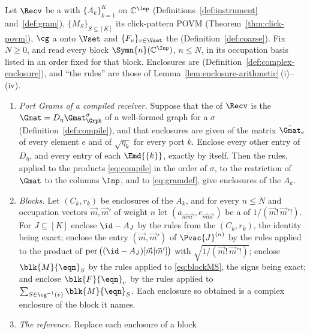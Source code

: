 \begin{theorem}\label{thm:enclosed-blocks}
Let $\Recv$ be a  with
 $\{A_k\}_{k=1}^{K}$ on
$\mathbb{C}^{\Inp}$ (Definitions~\ref{def:instrument} and~\ref{def:gram}),
$\{M_S\}_{S\subseteq[K]}$ its click-pattern POVM
(Theorem~\ref{thm:click-povm}), $\cg$ a  onto
$\Vset$ and $\{F_v\}_{v\in\Vset}$ the 
(Definition~\ref{def:coarse}). Fix $N\ge0$, and read every block
$\Symn{n}(\mathbb{C}^{\Inp})$, $n\le N$, in its occupation basis listed in an
order fixed for that block. Enclosures are
(Definition~\ref{def:complex-enclosure}), and ``the rules'' are those of
Lemma~\ref{lem:enclosure-arithmetic}\,(i)--(iv).
\begin{enumerate}[label=(\roman*),leftmargin=3.0em]
\item \emph{Port Grams of a compiled receiver.} Suppose that the
   of $\Recv$ is the
   $\Gmat=D_\eta\Gmat^{\sigma}_{\Grph}$ of a
  well-formed graph for a  $\sigma$
  (Definition~\ref{def:compile}), and that enclosures are given of the matrix
  $\hat\Gmat_e$ of every element $e$ and of $\sqrt{\eta_k}$ for every port
  $k$. Enclose every other entry of $D_\eta$, and every entry of each
  $\Emd{\{k\}}$, exactly by itself. Then the rules, applied to the products
  \eqref{eq:compile} in the order of $\sigma$, to the restriction of
  $\Gmat$ to the columns $\Inp$, and to \eqref{eq:gramdef}, give enclosures
  of the $A_k$.
\item \emph{Blocks.} Let $(C_k,r_k)$ be enclosures of the $A_k$, and for
  every $n\le N$ and occupation vectors $\vec m,\vec m'$ of weight $n$ let
  $(a_{\vec m\vec m'},e_{\vec m\vec m'})$ be a 
  of $1/(\vec m!\,\vec m'!)$. For $J\subseteq[K]$ enclose $\id-A_J$ by the
  rules from the $(C_k,r_k)$, the identity being exact; enclose the entry
  $(\vec m,\vec m')$ of $\Pvac{J}^{(n)}$ by the rules applied to the product
  of $\operatorname{per}\big((\id-A_J)[\vec m|\vec m']\big)$ with
  $\sqrt{1/(\vec m!\,\vec m'!)}$; enclose $\blk{M}{\eqn}_S$ by the rules
  applied to \eqref{eq:blockMS}, the signs being exact; and enclose
  $\blk{F}{\eqn}_v$ by the rules applied to
  $\sum_{S\in\cg^{-1}(v)}\blk{M}{\eqn}_S$. Each enclosure so obtained is a
  complex enclosure of the block it names.
\item \emph{The reference.} Replace each enclosure of a block

\end{enumerate}
\end{theorem}

